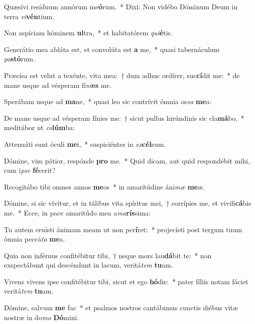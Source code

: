 \item Quæsívi resíduum annórum me\textbf{ó}rum.~* Dixi: Non vidébo Dóminum Deum in terra \textit{vi}\textbf{vén}tium.
\item Non aspíciam hóminem \textbf{ul}tra,~* et habitatórem \textit{qui}\textbf{é}tis.
\item Generátio mea abláta est, et convolúta est \textbf{a} me,~* quasi tabernáculum \textit{pa}\textbf{stó}rum.
\item Præcísa est velut a texénte, vita mea:~† dum adhuc ordírer, suc\textbf{cí}dit me:~* de mane usque ad vésperam fí\textit{ni}\textbf{es} me.
\item Sperábam usque ad \textbf{ma}ne,~* quasi leo sic contrívit ómnia os\textit{sa} \textbf{me}a:
\item De mane usque ad vésperam fínies me:~† sicut pullus hirúndinis sic cla\textbf{má}bo,~* meditábor ut \textit{co}\textbf{lúm}ba:
\item Attenuáti sunt óculi \textbf{me}i,~* suspiciéntes in \textit{ex}\textbf{cél}sum.
\item Dómine, vim pátior, respónde \textbf{pro} me.~* Quid dicam, aut quid respondébit mihi, cum i\textit{pse} \textbf{fé}cerit?
\item Recogitábo tibi omnes annos \textbf{me}os~* in amaritúdine áni\textit{mæ} \textbf{me}æ.
\item Dómine, si sic vívitur, et in tálibus vita spíritus mei,~† corrípies me, et vivifi\textbf{cá}bis me.~* Ecce, in pace amaritúdo mea a\textit{ma}\textbf{rís}sima:
\item Tu autem eruísti ánimam meam ut non per\textbf{í}ret:~* projecísti post tergum tuum ómnia peccá\textit{ta} \textbf{me}a.
\item Quia non inférnus confitébitur tibi,~† neque mors lau\textbf{dá}bit te:~* non exspectábunt qui descéndunt in lacum, veritá\textit{tem} \textbf{tu}am.
\item Vivens vivens ipse confitébitur tibi, sicut et ego \textbf{hó}die:~* pater fíliis notam fáciet veritá\hspace{0.02em}\textit{tem} \textbf{tu}am.
\item Dómine, salvum \textbf{me} fac~* et psalmos nostros cantábimus cunctis diébus vitæ nostræ in do\textit{mo} \textbf{Dó}mini.
